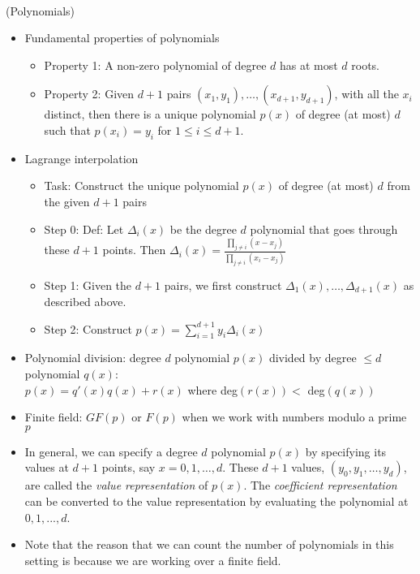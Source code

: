 \documentclass{article}
\begin{document}
\\
(Polynomials)
\begin{itemize}
	\item Fundamental properties of polynomials
	\begin{itemize}
		\item Property 1: A non-zero polynomial of degree $d$ has at most $d$ roots.
		\item Property 2: Given $d+1$ pairs $(x_1,y_1),\dots,(x_{d+1},y_{d+1})$, with all the $x_i$ distinct, then there is a unique polynomial $p(x)$ of degree (at most) $d$ such that $p(x_i)=y_i$ for $1\leq i\leq d+1$.
	\end{itemize}
	\item Lagrange interpolation
	\begin{itemize}
		\item Task: Construct the unique polynomial $p(x)$ of degree (at most) $d$ from the given $d+1$ pairs
		\item Step 0: Def: Let $\Delta_i(x)$ be the degree $d$ polynomial that goes through these $d+1$ points. Then $\Delta_i(x) = \frac{\prod_{j\neq i} (x-x_j)}{\prod_{j\neq i} (x_i-x_j)}$
		\item Step 1: Given the $d+1$ pairs, we first construct $\Delta_1(x),\dots, \Delta_{d+1}(x)$ as described above.
		\item Step 2: Construct $p(x) = \sum\limits_{i=1}^{d+1} y_i\Delta_i(x)$
	\end{itemize}
	\item Polynomial division: degree $d$ polynomial $p(x)$ divided by degree $\leq d$ polynomial $q(x)$: \\
	$p(x) = q'(x) q(x) + r(x)$ where deg$(r(x)) <$ deg$(q(x))$
	\item Finite field: $GF(p)$ or $F(p)$ when we work with numbers modulo a prime $p$
	\item In general, we can specify a degree $d$ polynomial $p(x)$ by specifying its values at $d+1$ points, say $x=0,1,\dots,d$. These $d+1$ values, $(y_0,y_1,\dots,y_d)$, are called the \textit{value representation} of $p(x)$. The \textit{coefficient representation} can be converted to the value representation by evaluating the polynomial at $0,1,...,d$.
	\item Note that the reason that we can count the number of polynomials in this setting is because we are working over a finite field.


\end{itemize}
\end{document}
